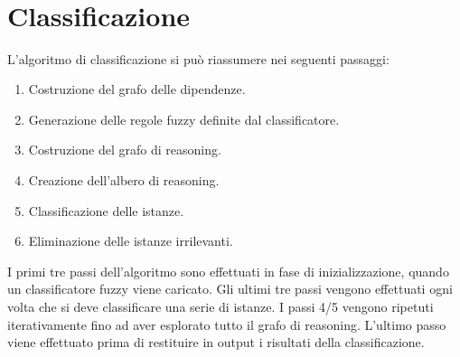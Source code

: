\begin{tiny}
\begin{bnf*}
		{ \bnfsp {} \bnfsp {} \bnfsp {} \bnfsp {} \bnfsp {}} \\
		{ \bnfsp {} \bnfsp {} \bnfsp {} \bnfsp {} \bnfsp \bnfts{(} \bnfsp {} \bnfsp \bnfts{,} \bnfsp {} \bnfsp \bnfts{)}} \\
		{ \bnfsp {} \bnfsp {} \bnfsp {} \bnfsp \bnfts{(} \bnfsp {} \bnfsp \bnfts{,} \bnfsp {} \bnfsp \bnfts{)}} \\
		{ \bnfsp {}
		\bnfor \bnfes} \\
		{ \bnfsp {}
		\bnfor \bnfes} \\
		{
		\bnfor {}} \\
	\end{bnf*}
\end{tiny}



\section{Classificazione}

L'algoritmo di classificazione si può riassumere nei seguenti passaggi:

\begin{enumerate} 
 \item Costruzione del grafo delle dipendenze.
 \item Generazione delle regole fuzzy definite dal classificatore.
 \item Costruzione del grafo di reasoning.
 \item Creazione dell'albero di reasoning.
 \item Classificazione delle istanze.
 \item Eliminazione delle istanze irrilevanti.
\end{enumerate}

I primi tre passi dell'algoritmo sono effettuati in fase di inizializzazione, quando un classificatore fuzzy viene caricato.
Gli ultimi tre passi vengono effettuati ogni volta che si deve classificare una serie di istanze.
I passi 4/5 vengono ripetuti iterativamente fino ad aver esplorato tutto il grafo di reasoning.
L'ultimo passo viene effettuato prima di restituire in output i risultati della classificazione.

